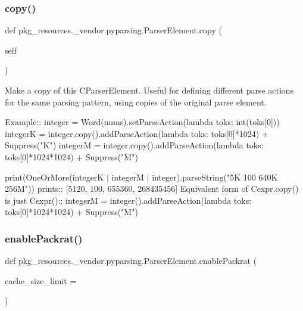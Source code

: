 \subsubsection{\texorpdfstring{copy()}{copy()}}
{\footnotesize\ttfamily def pkg\+\_\+resources.\+\_\+vendor.\+pyparsing.\+Parser\+Element.\+copy (\begin{DoxyParamCaption}\item[{}]{self }\end{DoxyParamCaption})}

\begin{DoxyVerb}Make a copy of this C{ParserElement}.  Useful for defining different parse actions
for the same parsing pattern, using copies of the original parse element.

Example::
    integer = Word(nums).setParseAction(lambda toks: int(toks[0]))
    integerK = integer.copy().addParseAction(lambda toks: toks[0]*1024) + Suppress("K")
    integerM = integer.copy().addParseAction(lambda toks: toks[0]*1024*1024) + Suppress("M")
    
    print(OneOrMore(integerK | integerM | integer).parseString("5K 100 640K 256M"))
prints::
    [5120, 100, 655360, 268435456]
Equivalent form of C{expr.copy()} is just C{expr()}::
    integerM = integer().addParseAction(lambda toks: toks[0]*1024*1024) + Suppress("M")
\end{DoxyVerb}
 \mbox{\label{classpkg__resources_1_1__vendor_1_1pyparsing_1_1_parser_element_a93be52be442d95742db8b799a5a1c7b3}} 
\subsubsection{\texorpdfstring{enable\+Packrat()}{enablePackrat()}}
{\footnotesize\ttfamily def pkg\+\_\+resources.\+\_\+vendor.\+pyparsing.\+Parser\+Element.\+enable\+Packrat (\begin{DoxyParamCaption}\item[{}]{cache\+\_\+size\+\_\+limit = {} }\end{DoxyParamCaption})\hspace{0.3cm}{\ttfamily [static]}}

